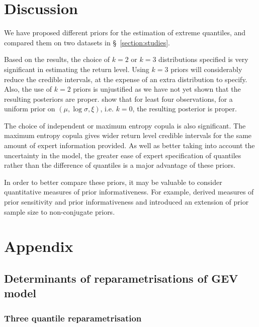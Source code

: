 \documentclass{article}
\begin{document}
\section{Discussion}
%

%
We have proposed different priors for the estimation of extreme quantiles,
and compared them on two datasets in \S~\ref{section:studies}.
%

%
Based on the results,
the choice of $k = 2$ or
$k = 3$ distributions specified is very significant
in estimating the return level.
Using $k = 3$ priors will considerably reduce the credible intervals,
at the expense of an extra distribution to specify.
Also, the use of $k = 2$ priors is unjustified as we have not yet
shown that the resulting posteriors are proper.
\cite{northrop2016} show that for least four observations,
for a uniform prior on $(\mu, \log \sigma, \xi)$,
i.e. $k = 0$, the resulting posterior is proper.
%

%
The choice of independent or maximum entropy copula is also significant.
The maximum entropy copula gives wider return level credible intervals
for the same amount of expert information provided.
As well as better taking into account the uncertainty in the model,
the greater ease of expert specification of
quantiles rather than the difference of quantiles
is a major advantage of these priors.
%

%
In order to better compare these priors,
it may be valuable to consider quantitative measures of
prior informativeness.
For example,
\cite{reimherr2014prior} derived measures
of prior sensitivity and prior informativeness
and \cite{reimherr2014prior} introduced an extension
of prior sample size to non-conjugate priors.
%
\section{Appendix}
%
\subsection{Determinants of reparametrisations of GEV model}
\label{appendix:reparametrisation}
%
\subsubsection*{Three quantile reparametrisation}
%
\end{document}
